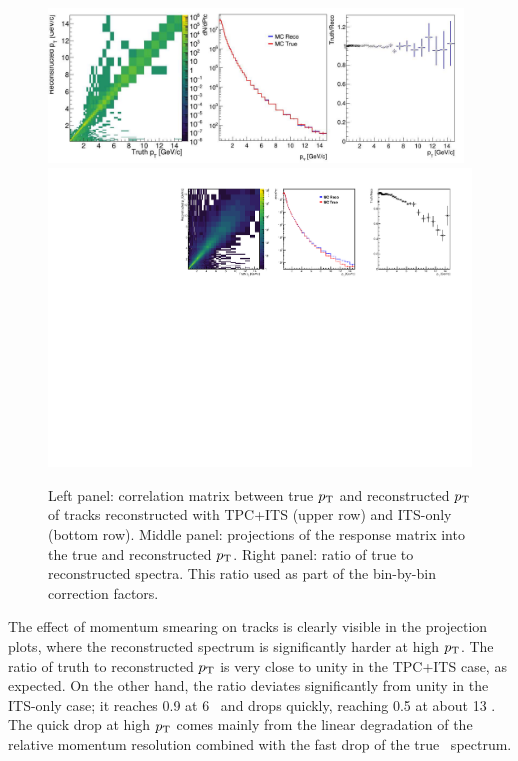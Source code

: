 \begin{figure}[h!]
\includegraphics[width=0.98\textwidth]{Data_Analysis/Tracking/Matrix_tracking_tpc_MBMC_0GeV15GeV_dNdPt.pdf}\\
\includegraphics[width=1.0\textwidth]{Data_Analysis/Tracking/Matrix_tracking_its_MBMC_0GeV15GeV_dNdPt.pdf}

\caption{Left panel: correlation matrix between true $p_{\mathrm{T}}$ and reconstructed $p_{\mathrm{T}}$ of tracks reconstructed with TPC+ITS (upper row) and ITS-only (bottom row). Middle panel: projections of the response matrix into the true and reconstructed $p_{\mathrm{T}}$. Right panel: ratio of true to reconstructed spectra. This ratio used as part of the bin-by-bin correction factors.}
\label{fig:responseMatrixTPC}
\end{figure}

The effect of momentum smearing on tracks is clearly visible in the projection plots, where the reconstructed spectrum is significantly harder at high $p_{\mathrm{T}}$. The ratio of truth to reconstructed $p_{\mathrm{T}}$ is very close to unity in the TPC+ITS case, as expected. On the other hand, the ratio deviates significantly from unity in the ITS-only case; it reaches 0.9 at 6 \GeVc~and drops quickly, reaching 0.5 at about 13 \GeVc. The quick drop at high $p_{\mathrm{T}}$ comes mainly from the linear degradation of the relative momentum resolution combined with the fast drop of the true \pt~spectrum. 

